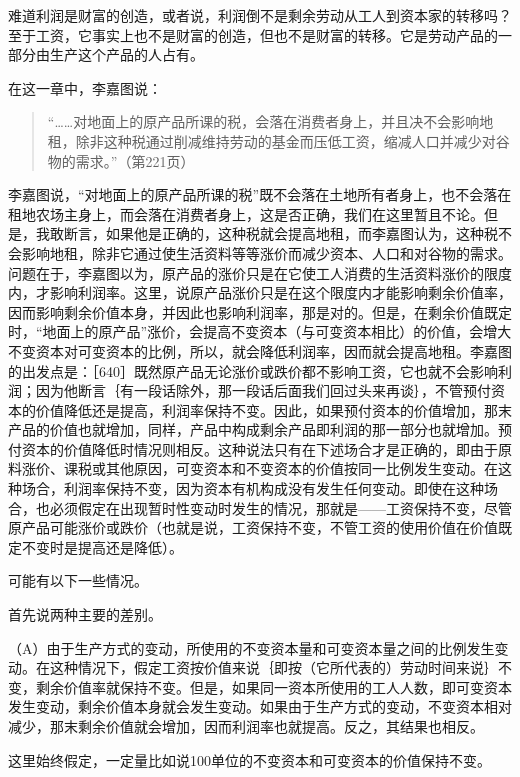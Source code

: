 难道利润是财富的创造，或者说，利润倒不是剩余劳动从工人到资本家的转移吗？至于工资，它事实上也不是财富的创造，但也不是财富的转移。它是劳动产品的一部分由生产这个产品的人占有。

在这一章中，李嘉图说：

\begin{quote}{“……对地面上的原产品所课的税，会落在消费者身上，并且决不会影响地租，除非这种税通过削减维持劳动的基金而压低工资，缩减人口并减少对谷物的需求。”（第221页）}\end{quote}

李嘉图说，“对地面上的原产品所课的税”既不会落在土地所有者身上，也不会落在租地农场主身上，而会落在消费者身上，这是否正确，我们在这里暂且不论。但是，我敢断言，如果他是正确的，这种税就会提高地租，而李嘉图认为，这种税不会影响地租，除非它通过使生活资料等等涨价而减少资本、人口和对谷物的需求。问题在于，李嘉图以为，原产品的涨价只是在它使工人消费的生活资料涨价的限度内，才影响利润率。这里，说原产品涨价只是在这个限度内才能影响剩余价值率，因而影响剩余价值本身，并因此也影响利润率，那是对的。但是，在剩余价值既定时，“地面上的原产品”涨价，会提高不变资本（与可变资本相比）的价值，会增大不变资本对可变资本的比例，所以，就会降低利润率，因而就会提高地租。李嘉图的出发点是：［640］既然原产品无论涨价或跌价都不影响工资，它也就不会影响利润；因为他断言｛有一段话除外，那一段话后面我们回过头来再谈｝，不管预付资本的价值降低还是提高，利润率保持不变。因此，如果预付资本的价值增加，那末产品的价值也就增加，同样，产品中构成剩余产品即利润的那一部分也就增加。预付资本的价值降低时情况则相反。这种说法只有在下述场合才是正确的，即由于原料涨价、课税或其他原因，可变资本和不变资本的价值按同一比例发生变动。在这种场合，利润率保持不变，因为资本有机构成没有发生任何变动。即使在这种场合，也必须假定在出现暂时性变动时发生的情况，那就是——工资保持不变，尽管原产品可能涨价或跌价（也就是说，工资保持不变，不管工资的使用价值在价值既定不变时是提高还是降低）。

可能有以下一些情况。

首先说两种主要的差别。

（A）由于生产方式的变动，所使用的不变资本量和可变资本量之间的比例发生变动。在这种情况下，假定工资按价值来说｛即按（它所代表的）劳动时间来说｝不变，剩余价值率就保持不变。但是，如果同一资本所使用的工人人数，即可变资本发生变动，剩余价值本身就会发生变动。如果由于生产方式的变动，不变资本相对减少，那末剩余价值就会增加，因而利润率也就提高。反之，其结果也相反。

这里始终假定，一定量比如说100单位的不变资本和可变资本的价值保持不变。

